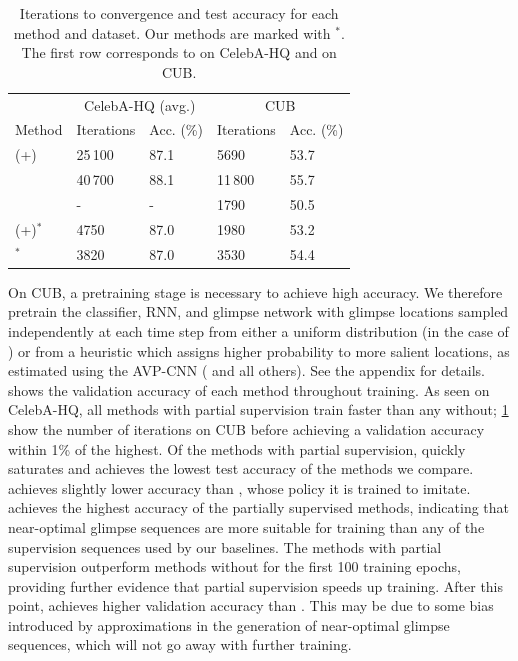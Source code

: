 \begin{table}
  \caption{Iterations to convergence and test accuracy for each method and
    dataset. Our methods are marked with {$^*$}. The first row corresponds to
    \RAM{} on CelebA-HQ and \RAMP{} on CUB.}
  \vspace{-.1cm}
  \label{tab:results}
  \centering
  \begin{tabular}{lllll}
    \toprule
    \multicolumn{1}{r}{} & \multicolumn{2}{c}{CelebA-HQ (avg.)} & \multicolumn{2}{c}{CUB}                 \\
    \cmidrule(r){2-3} \cmidrule(r){4-5}
    Method     & Iterations & Acc. (\%)  & Iterations & Acc. (\%)  \\
    \midrule
    \RAM{}(+)     & 25\,100     & 87.1           & 5690           & 53.7          \\
    \WSRAM{}             & 40\,700     & {88.1}         & 11\,800        & {55.7}        \\
    \HGS{}               & -           & -              & {1790}         & 50.5          \\
    \PSRAM{}(+)$^*$      & 4750        & 87.0           & 1980           & 53.2          \\
    \PSNOGS{}$^*$        & {3820}      & 87.0           & 3530           & 54.4          \\
    \bottomrule
  \end{tabular}
  \vspace{-.2cm}
\end{table}


 On CUB, a pretraining stage is
necessary to achieve high accuracy. We therefore pretrain the classifier, RNN,
and glimpse network with glimpse locations sampled independently at each time
step from either a uniform distribution (in the case of \RAM) or from a
heuristic which assigns higher probability to more salient locations, as
estimated using the AVP-CNN (\RAMP{} and all others). See the
appendix for details.
 shows the validation accuracy of each method
throughout training.
%
As seen on CelebA-HQ, all methods with partial supervision train faster than any
without; \cref{tab:results} show the number of iterations on CUB before
achieving a validation accuracy within 1\% of the highest. Of the methods with
partial supervision, \HGS{} quickly saturates and achieves the lowest test
accuracy of the methods we compare. \PSRAMP{} achieves slightly lower accuracy
than \RAMP{}, whose policy it is trained to imitate. \PSNOGS{} achieves the
highest accuracy of the partially supervised methods, indicating that
near-optimal glimpse sequences are more suitable for training than any of the
supervision sequences used by our baselines. The methods with partial
supervision outperform methods without for the first 100 training epochs,
providing further evidence that partial supervision speeds up training. After
this point, \WSRAM{} achieves higher validation accuracy than \PSNOGS{}. This
may be due to some bias introduced by approximations in the generation of
near-optimal glimpse sequences, which will not go away with further training.

